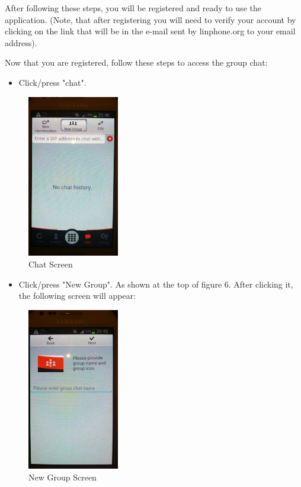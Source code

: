 \documentclass[a4paper]{article}
\begin{document}
After following these steps, you will be registered and ready to use the application. (Note, that after registering you will need to verify your account by clicking on the link that will be in the e-mail sent by linphone.org to your email address).

Now that you are registered, follow these steps to access the group chat:

\begin{itemize}
\item Click/press "chat".
\end{itemize}

\begin{figure}[h]
\centering
\includegraphics[scale=0.30, width=40mm]{./pictures/s1.jpg}
\caption{\label{fig:Agile}Chat Screen}
\end{figure}

\begin{itemize}
\item Click/press "New Group". As shown at the top of figure 6. After clicking it, the following screen will appear:
\end{itemize}

\begin{figure}[h]
\centering
\includegraphics[scale=0.30, width=40mm]{./pictures/s2.jpg}
\caption{\label{fig:Agile}New Group Screen}
\end{figure}
\end{document}
